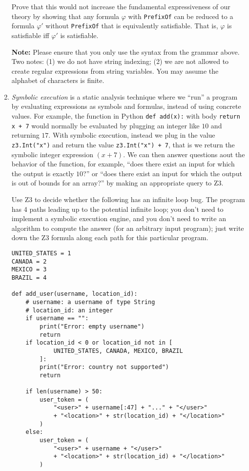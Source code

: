 \documentclass{article}
\begin{document}
\begin{enumerate}
Prove that this would not increase the fundamental expressiveness of our theory by showing that
any formula $\varphi$ with \texttt{PrefixOf} can be reduced to a formula $\varphi'$ without \texttt{PrefixOf} that is equivalently satisfiable.
That is, $\varphi$ is satisfiable iff $\varphi'$ is satisfiable.

\textbf{Note:}
Please ensure that you only use the syntax from the grammar above. Two notes: (1) we do not have string indexing; (2) we are not allowed to create regular expressions from string variables. You may assume the alphabet of characters is finite.

\item
\emph{Symbolic execution} is a static analysis technique where we ``run'' a program by evaluating expressions as symbols and formulas, instead of using concrete values.
For example, the function in Python \texttt{def add(x):} with body \texttt{return x + 7} would normally be evaluated
by plugging an integer like $10$ and returning $17$. With symbolic execution, instead we plug in the value
\texttt{z3.Int("x")} and return the value \texttt{z3.Int("x") + 7}, that is we return the symbolic integer expression $(x + 7)$. We can then answer questions aout the behavior of the function, for example, ``does there exist an input for which the output is exactly $10$?'' or ``does there exist an input for which the output is out of bounds for an array?'' by making an appropriate query to Z3.

Use Z3 to decide whether the following has an infinite loop bug.
The program has 4 paths leading up to the potential infinite loop; you don't need to implement a symbolic execution engine, and you don't need to write an algorithm to compute the answer (for an arbitrary input program); just write down the Z3 formula along each path for this particular program.

\begin{verbatim}
UNITED_STATES = 1
CANADA = 2
MEXICO = 3
BRAZIL = 4

def add_user(username, location_id):
    # username: a username of type String
    # location_id: an integer
    if username == "":
        print("Error: empty username")
        return
    if location_id < 0 or location_id not in [
            UNITED_STATES, CANADA, MEXICO, BRAZIL
        ]:
        print("Error: country not supported")
        return

    if len(username) > 50:
        user_token = (
            "<user>" + username[:47] + "..." + "</user>"
            + "<location>" + str(location_id) + "</location>"
        )
    else:
        user_token = (
            "<user>" + username + "</user>"
            + "<location>" + str(location_id) + "</location>"
        )


\end{verbatim}
\end{enumerate}
\end{document}
